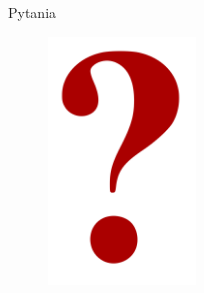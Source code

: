 \documentclass[xcolor=dvipsnames]{beamer}
\begin{document}
\begin{frame}{Pytania}
  \begin{figure}
    \includegraphics[width=0.35\textwidth]{img/question-mark-red.png} 
  \end{figure}
\end{frame}
\end{document}
